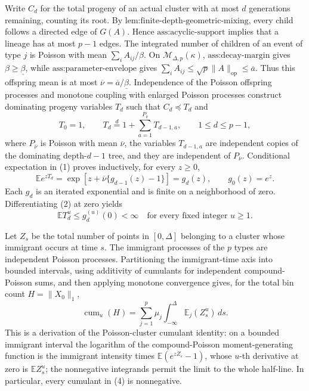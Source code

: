 Write \(C_d\) for the total progeny of an actual cluster with at most \(d\) generations remaining, counting its root.  By \(\text{lem:finite-depth-geometric-mixing}\), every child follows a directed edge of \(G(A)\).  Hence \(\text{ass:acyclic-support}\) implies that a lineage has at most \(p-1\) edges.  The integrated number of children of an event of type \(j\) is Poisson with mean \(\sum_i A_{ij}/\beta\).  On \(\mathcal M_{\Delta,p}(\kappa)\), \(\text{ass:decay-margin}\) gives \(\beta\geq\underline\beta\), while \(\text{ass:parameter-envelope}\) gives \(\sum_iA_{ij}\leq\sqrt p\lVert A\rVert_{\mathrm{op}}\leq\overline a\).  Thus this offspring mean is at most \(\overline\nu=\overline a/\underline\beta\).  Independence of the Poisson offspring processes and monotone coupling with enlarged Poisson processes construct dominating progeny variables \(T_d\) such that \(C_d\preceq T_d\) and
\[
 T_0=1,
 \qquad
 T_d\mathrel{\stackrel{d}{=}} 1+\sum_{a=1}^{P_{\overline\nu}}T_{d-1,a},
 \qquad 1\leq d\leq p-1,
\tag{1}
\]
where \(P_{\overline\nu}\) is Poisson with mean \(\overline\nu\), the variables \(T_{d-1,a}\) are independent copies of the dominating depth-\(d-1\) tree, and they are independent of \(P_{\overline\nu}\).  Conditional expectation in (1) proves inductively, for every \(z\geq0\),
\[
 \mathbb E e^{zT_d}
 = \exp\!\left[z+\overline\nu\{g_{d-1}(z)-1\}\right]
 =g_d(z),
 \qquad g_0(z)=e^z.
\tag{2}
\]
Each \(g_d\) is an iterated exponential and is finite on a neighborhood of zero.  Differentiating (2) at zero yields
\[
 \mathbb E T_d^u\leq g_d^{(u)}(0)<\infty
 \quad\text{for every fixed integer }u\geq1.
\tag{3}
\]

Let \(Z_s\) be the total number of points in \([0,\Delta]\) belonging to a cluster whose immigrant occurs at time \(s\).  The immigrant processes of the \(p\) types are independent Poisson processes.  Partitioning the immigrant-time axis into bounded intervals, using additivity of cumulants for independent compound-Poisson sums, and then applying monotone convergence gives, for the total bin count \(H=\lVert X_0\rVert_1\),
\[
 \operatorname{cum}_u(H)
 =\sum_{j=1}^p\mu_j\int_{-\infty}^{\Delta}
       \mathbb E_j(Z_s^u)\,ds.
\tag{4}
\]
This is a derivation of the Poisson-cluster cumulant identity: on a bounded immigrant interval the logarithm of the compound-Poisson moment-generating function is the immigrant intensity times \(\mathbb E(e^{zZ_s}-1)\), whose \(u\)-th derivative at zero is \(\mathbb E Z_s^u\); the nonnegative integrands permit the limit to the whole half-line.  In particular, every cumulant in (4) is nonnegative.

